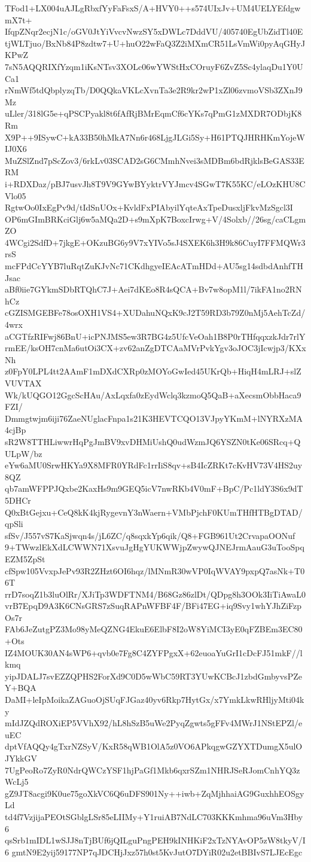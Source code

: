 TFod1+LX004uAJLgRbxfYyFaFsxS/A+HVY0++s574UIxJv+UM4UELYEfdgwmX7t+
IfqpZNqr2ecjN1c/oGV0JtYiVvcvNwzSY5xDWLc7DddVU/405740EgUbZidTl40E
tjWLTjuo/BxNb84P8zdtw7+U+huO22wFaQ3Z2iMXmCR51LsVmWi0pyAqGHyJKPwZ
7sN5AQQRIXfYzqm1iKsNTsv3XOLc06wYWStHxCOruyF6ZvZ5Sc4ylaqDu1Y0UCa1
rNmWf5tdQbplyzqTb/D0QQkaVKLcXvnTa3e2R9kr2wP1xZl06zvmoVSb3ZXnJ9Mz
uLler/318lG5e+qPSCPyakl8t6fAfRjBMrEqmCf6cYKs7qPmG1zMXDR7ODbjK8Rm
X9P++9ISywC+kA33B50hMkA7Nn6r468LjgJLGi5Sy+H61PTQJHRHKmYojeWIJ0X6
MuZSlZnd7pScZov3/6rkLv03SCAD2sG6CMmhNvei3sMDBm6bdRjklsBeGAS33ERM
i+RDXDaz/pBJ7usvJh8T9V9GYwBYyktrVYJmcv4SGwT7K55KC/eLOzKHU8CVlo05
RgtwOo0IxEgPv9d/tIdSnUOx+KvldFxPIAbyilYqteAxTpeDusxljFkvMzSgcl3I
OP6mGImBRKciGlj6w5aMQa2D+s9mXpK7BoxcIrwg+V/4Solxb//26sg/caCLgmZO
4WCgi2SdfD+7jkgE+OKzuBG6y9V7xYIVo5sJ4SXEK6h3H9k86CuyI7FFMQWr3rsS
mcFPdCcYYB7luRqtZuKJvNc71CKdhgyeIEAcATmHDd+AU5sg14sdbdAnhfTHJsac
aBf0iie7GYkmSDbRTQhC7J+Aei7dKEo8R4sQCA+Bv7w8opM1l/7ikFA1no2RNhCz
cGZISMGEBFe78osOXH1VS4+XUDahuNQxK9cJ2T59RD3b79Z0nMj5AehTcZd/4wrx
aCGTfzRIFwj86BnU+icPNJMS5ew3R7BG4z5UfcVeOah1B8P0rTHfqqxzkJdr7rlY
rmEE/ksOH7cnMa6utOi3CX+zv62anZgDTCAaMVrPvkYgv3oJOC3jIcwjp3/KXxNh
z0FpY0LPL4tt2AAmF1mDXdCXRp0zMOYoGwIed45UKrQb+HiqH4mLRJ+slZVUVTAX
Wk/kUQGO12GgcScHAu/AxLqxfa0zEydWclq3kzmoQ5QaB+aXecsmObbHaca9FZI/
Dmmgtwjm6iji76ZaeNUglacFnpa1s21K3HEVTCQO13VJpyYKmM+lNYRXzMA4cjBp
sR2W8TTHLiwwrHqPgJmBV9xvDHMiUshQ0udWzmJQ6YSZN0tKe06SRcq+QULpW/bz
eYw6aMU0SrwHKYa9X8MFR0YRdFc1rrIiS8qv+sB4IcZRKt7cKvHV73V4HS2uy8QZ
qb7amWFPPJQxbe2KaxHs9m9GEQ5icV7nwRKb4V0mF+BpC/Pc1ldY3S6x9dT5DHCr
Q0xBtGejxu+CeQ8kK4kjRygevnY3nWaern+VMbPjchF0KUmTHfHTBgDTAD/qpSli
sfSv/J557vS7KaSjwqn4s/jL6ZC/q8sqxkYp6qik/Q8+FGB961Ut2CrvapaOONuf
9+TWwzlEkXdLCWWN71XsvuJgHgYUKWWjpZwywQJNEJrmAauG3uTooSpqEZM5ZpSt
cfSpw105VvxpJePv93R2ZHzt6OI6hqz/lMNmR30wVP0IqWVAY9pxpQ7asNk+T06T
rrD7soqZ1b3luOlRr/XJiTp3WDFTNM4/B68Gz86zlDt/QDpg8h3OOk3IiTiAwaL0
vrB7EpqD9A3K6CNsGRS7zSuqRAPnWFBF4F/BFi47EG+iq9Svy1whYJhZiFzpOs7r
FAb6JeZutgPZ3Mo98yMeQZNG4EkuE6ElbF8I2oW8YiMCI3yE0qFZBEm3EC80+Ots
IZ4MOUK30AN4sWP6+qvb0e7Fg8C4ZYFPgxX+62euoaYuGrI1cDcFJ51mkF//lkmq
yipJDALJ7svEZZQPHS2ForXd9C0D5wWbC59RT3YUwKCBcJ1zbdGmbyvsPZeY+BQA
DaMI+leIpMoikaZAGuoOjSUqFJGaz40yv6Rkp7HytGx/x7YmkLkwRHljyMti04ky
mIdJZQdROXiEP5VVhX92/hL8hSzB5uWe2PyqZgwts5gFFv4MWrJ1NStEPZl/euEC
dptVfAQQy4gTxrNZSyV/KxR58qWB1OlA5z0VO6APkqgwGZYXTDumgX5ulOJYkkGV
7UgPeoRo7ZyR0NdrQWCzYSF1hjPaGf1Mkb6qxrSZm1NHRJSeRJomCnhYQ3zWcLj5
gZ9JT8acgi9K0ue75goXkVC6Q6uDFS901Ny++iwb+ZqMjhhaiAG9GuxhhEOSgyLd
td4f7VzjijaPEOtSGblgLSr85eLIIMy+Y1ruiAB7NdLC703KKKmhma96uVm3Hby6
qsSrb1mIDL1wSJJ8nTjBUf6jQILguPngPEH9kINHKiF2xTzNYAvOP5zW8tkyV/I6
gmtN9E2yij59177NP7qJDCHjJxz57h0st5KvJutO7DYiR02u2etBBIvS7LJEcEgc

